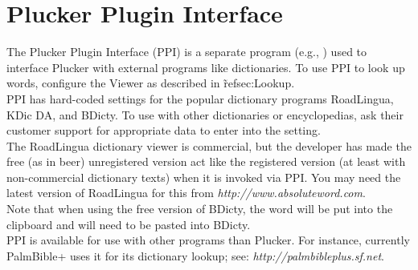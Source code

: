 %
%
\chapter{Plucker Plugin Interface}\label{sec:PPI}

The Plucker Plugin Interface (PPI) is a separate program (e.g.,
) used to interface Plucker with external programs
like dictionaries.  To use PPI to look up words, configure the Viewer
as described in \~ref{sec:Lookup}.\\

PPI has hard-coded settings for the popular dictionary programs RoadLingua,
KDic DA, and BDicty.  To use with other dictionaries or encyclopedias, ask
their customer support for appropriate data to enter into the 
setting.\\

The RoadLingua dictionary viewer is commercial, but the developer has made the
free (as in beer) unregistered version act like the registered version 
(at least with non-commercial dictionary texts) when it is invoked via PPI.  
You may need the latest version of RoadLingua for this from
\textit{
{http://www.absoluteword.com}}.\\

Note that when using the free version of BDicty, the word will
be put into the clipboard and will need to be pasted into BDicty.\\

PPI is available for use with other programs than Plucker.  For instance,
currently PalmBible+ uses it for its dictionary lookup;  see:
\textit{
{http://palmbibleplus.sf.net}}.

